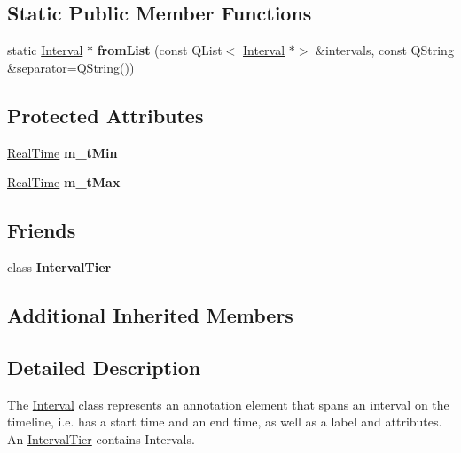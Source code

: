 \subsection*{Static Public Member Functions}
\begin{DoxyCompactItemize}
\item 
\mbox{\label{class_interval_a1f9174b8fa600da6a3b3959d91d4a65a}} 
static \hyperlink{class_interval}{Interval} $\ast$ {\bfseries from\+List} (const Q\+List$<$ \hyperlink{class_interval}{Interval} $\ast$$>$ \&intervals, const Q\+String \&separator=Q\+String())
\end{DoxyCompactItemize}
\subsection*{Protected Attributes}
\begin{DoxyCompactItemize}
\item 
\mbox{\label{class_interval_a83562012d99254b155d89029235c79ba}} 
\hyperlink{struct_real_time}{Real\+Time} {\bfseries m\+\_\+t\+Min}
\item 
\mbox{\label{class_interval_abc7a5e25e29c3ff9ea7133e06935f920}} 
\hyperlink{struct_real_time}{Real\+Time} {\bfseries m\+\_\+t\+Max}
\end{DoxyCompactItemize}
\subsection*{Friends}
\begin{DoxyCompactItemize}
\item 
\mbox{\label{class_interval_aee81cd0812997641a48f7be74a170117}} 
class {\bfseries Interval\+Tier}
\end{DoxyCompactItemize}
\subsection*{Additional Inherited Members}


\subsection{Detailed Description}
The \hyperlink{class_interval}{Interval} class represents an annotation element that spans an interval on the timeline, i.\+e. has a start time and an end time, as well as a label and attributes. An \hyperlink{class_interval_tier}{Interval\+Tier} contains Intervals. 

